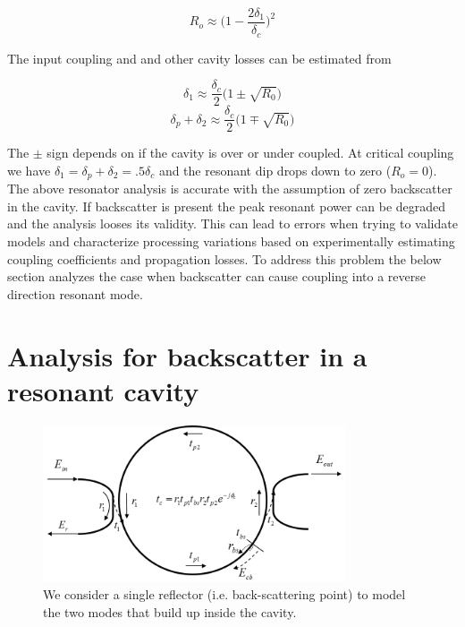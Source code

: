 \documentclass[10pt]{article}
\begin{document}
\begin{equation} 
R_o \approx \Big( 1 -  \frac{2 \delta_1}{\delta_c}       \Big)^2
\end{equation}

\noindent  The input coupling and and other cavity losses can be estimated from

\begin{equation} 
\delta_1 \approx \frac{\delta_c}{2} \big(1 \pm \sqrt{R_0} \big) 
\end{equation}
\begin{equation} 
\delta_p + \delta_2  \approx \frac{\delta_c}{2} \big(1 \mp \sqrt{R_0} \big) 
\end{equation}

\noindent  The $\pm$ sign depends on if the cavity is over or under coupled.  At critical coupling we have  $\delta_1 = \delta_p + \delta_2 = .5\delta_c$  and the resonant dip drops down to zero ($R_o = 0$).  
The above  resonator analysis is accurate with the assumption of zero backscatter in the cavity.  If backscatter is present the peak resonant power can be degraded and the analysis looses its validity.  This can lead to errors when trying to validate models and characterize processing variations based on experimentally estimating coupling coefficients and propagation losses.  To address this problem the below section analyzes the case when backscatter can cause coupling into a reverse direction resonant mode.  



\section{Analysis for backscatter in a resonant cavity}

\begin{figure}[htbp]
\centering\includegraphics[width=0.8\textwidth]{figures/bs_v3}
\caption{
We consider a single reflector (i.e. back-scattering point) to model the two modes that build up inside the cavity.
}
\label{fig:bs}
\end{figure}
\end{document}
